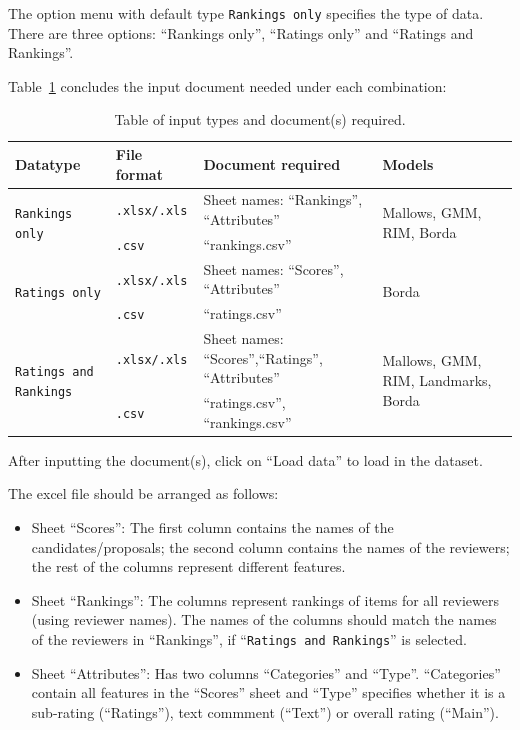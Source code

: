 \documentclass[a4paper,11pt]{memoir}
\begin{document}
The option menu with default type \texttt{Rankings only} specifies the type of data.
There are three options: ``Rankings only'', ``Ratings only'' and ``Ratings and Rankings''.

Table~\ref{tab:input} concludes the input document needed under each combination:

\begin{table}[H]
  \centering
  \scriptsize
  \begin{tabular}{l|l|p{3.5cm}|l}
    \toprule
    Datatype & File format & Document required & Models\\
    \midrule
    \multirow{2}{*}{\texttt{Rankings only}} & \texttt{.xlsx/.xls} & Sheet names: ``Rankings'', ``Attributes''
    & \multirow{2}{*}{Mallows, GMM,  RIM, Borda} \\
    \cline{2-3}
    & \texttt{.csv} & ``rankings.csv''& \\
    \hline
    \multirow{2}{*}{\texttt{Ratings only}} & \texttt{.xlsx/.xls} & Sheet names: ``Scores'', ``Attributes''
    & \multirow{2}{*}{Borda} \\
    \cline{2-3}
    & \texttt{.csv} & ``ratings.csv'' & \\
    \hline
    \multirow{2}{*}{\texttt{Ratings and Rankings}} & \texttt{.xlsx/.xls} & Sheet names: ``Scores'',``Ratings'', ``Attributes'' & \multirow{2}{*}{Mallows, GMM, RIM, Landmarks, Borda} \\
    \cline{2-3}
    & \texttt{.csv} & ``ratings.csv'', ``rankings.csv''& \\
    \bottomrule
  \end{tabular}
  \caption{Table of input types and document(s) required.}\label{tab:input}
\end{table}

After inputting the document(s), click on ``Load data'' to load in the dataset.

The excel file should be arranged as follows:
\begin{itemize}
  \item Sheet ``Scores'': The first column contains the names of the candidates/proposals; the second column contains the names of the reviewers; the rest of the columns represent different features.
  \item Sheet ``Rankings'': The columns represent rankings of items for all reviewers (using reviewer names). The names of the columns should match the names of the reviewers in ``Rankings'', if ``\texttt{Ratings and Rankings}'' is selected.
  \item Sheet ``Attributes'': Has two columns ``Categories'' and ``Type''. ``Categories'' contain all features in the ``Scores'' sheet and ``Type'' specifies whether it is a sub-rating (``Ratings''), text commment (``Text'') or overall rating (``Main'').
\end{itemize}
\end{document}
